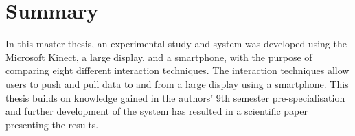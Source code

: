 \section*{Summary}\label{sec:summary}
In this master thesis, an experimental study and system was developed using the Microsoft Kinect, a large display, and a smartphone, with the purpose of comparing eight different interaction techniques. 
The interaction techniques allow users to push and pull data to and from a large display using a smartphone.
This thesis builds on knowledge gained in the authors' 9th semester pre-specialisation and further development of the system has resulted in a scientific paper presenting the results.
